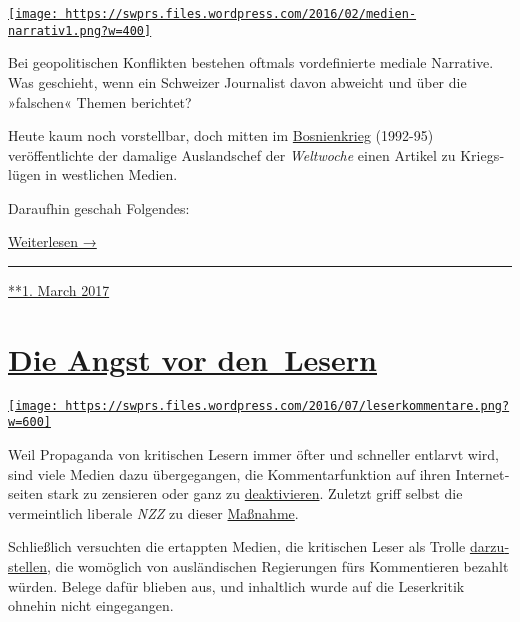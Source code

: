 \href{https://swprs.org/2017/03/01/das-gewuenschte-narrativ/}{\texttt{[image: https://swprs.files.wordpress.com/2016/02/medien-narrativ1.png?w=400]}}

Bei geopolitischen Konflikten bestehen oftmals vordefinierte mediale
Narrative. Was geschieht, wenn ein Schweizer Jour­na­list davon abweicht
und über die »falschen« Themen be­richtet?

Heute kaum noch vorstellbar, doch mitten im
\href{https://de.wikipedia.org/wiki/Bosnienkrieg}{Bosnien­krieg}
(1992-95) veröffentlichte der damalige Aus­lands­chef der
\emph{Welt­woche} einen Artikel zu Kriegs­lügen in west­lichen Medien.

Daraufhin geschah Folgendes:

\href{https://swprs.org/das-gewuenschte-narrativ\#weiterlesen}{Weiterlesen
→}

\begin{center}\rule{0.5\linewidth}{\linethickness}\end{center}

\href{https://swprs.org/2017/03/01/das-gewuenschte-narrativ/}{**1. March
2017}

\hypertarget{die-angst-vor-den-lesern}{%
\section{\texorpdfstring{\href{https://swprs.org/2017/03/01/leserkommentare/}{Die
Angst vor
den~Lesern}}{Die Angst vor den~Lesern}}\label{die-angst-vor-den-lesern}}

\href{https://swprs.org/2017/03/01/leserkommentare/}{\texttt{[image: https://swprs.files.wordpress.com/2016/07/leserkommentare.png?w=600]}}

Weil Propaganda von kritischen Lesern immer öfter und schneller entlarvt
wird, sind viele Medien dazu über­ge­gangen, die Kommentar­funktion auf
ihren Inter­net­­seiten stark zu zensieren oder ganz zu
\href{https://www.heise.de/tp/features/Konzentriertes-Gejammer-NZZ-schliesst-Kommentarspalte-3618957.html}{deaktivieren}.
Zuletzt griff selbst die vermeintlich liberale \emph{NZZ} zu dieser
\href{https://www.heise.de/tp/features/Konzentriertes-Gejammer-NZZ-schliesst-Kommentarspalte-3618957.html}{Maßnahme}.

Schließlich versuchten die ertappten Medien, die kri­ti­schen Leser als
Trolle
\href{https://www.nzz.ch/international/putins-internetpiraten-1.18324628}{dar­zu­stellen},
die womöglich von aus­län­dischen Re­gie­rungen fürs Kom­men­tieren
bezahlt würden. Be­lege da­für blie­ben aus, und inhaltlich wurde auf
die Leser­kritik ohnehin nicht ein­ge­gangen.

